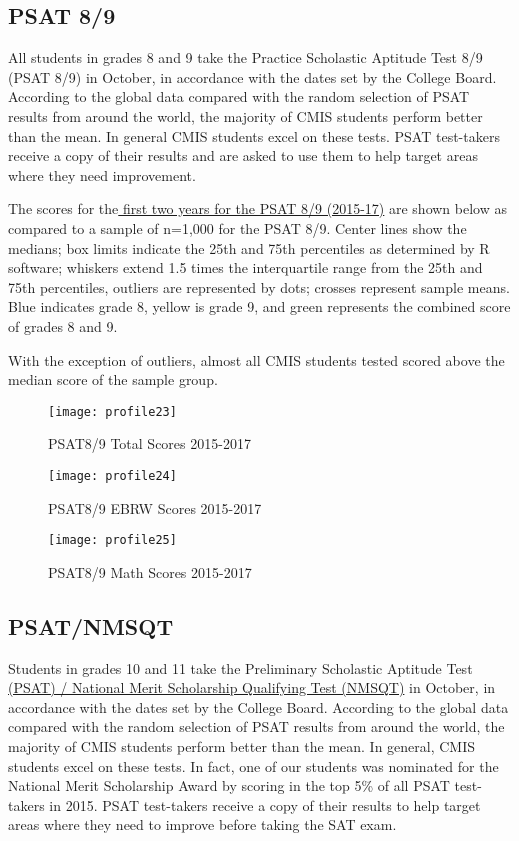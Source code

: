 \subsection{PSAT 8/9}

All students in grades 8 and 9 take the Practice Scholastic Aptitude Test 8/9 (PSAT 8/9) in October, in accordance with the dates set by the College Board. According to the global data compared with the random selection of PSAT results from around the world, the majority of CMIS students perform better than the mean. In general CMIS students excel on these tests.   PSAT test-takers receive a copy of their results and are asked to use them to help target areas where they need improvement.  

The scores for the\href{https://docs.google.com/a/cmis.ac.th/spreadsheets/d/1OVMnw4x1eUg-QByMt2J2IZJkovZGys_8uoj1SKSM2As/edit?usp=sharing}{ first two years for the PSAT 8/9 (2015-17)} are shown below as compared to a sample of n=1,000 for the PSAT 8/9.  Center lines show the medians; box limits indicate the 25th and 75th percentiles as determined by R software; whiskers extend 1.5 times the interquartile range from the 25th and 75th percentiles, outliers are represented by dots; crosses represent sample means. Blue indicates grade 8, yellow is grade 9, and green represents the combined score of grades 8 and 9.  

With the exception of outliers, almost all CMIS students tested scored above the median score of the sample group.  

\begin{figure}
\centering
\texttt{[image: profile23]}
\caption{PSAT8/9 Total Scores 2015-2017}
\end{figure}

\begin{figure}
\centering
\texttt{[image: profile24]}
\caption{PSAT8/9 EBRW Scores 2015-2017}
\end{figure}

\begin{figure}
\centering
\texttt{[image: profile25]}
\caption{PSAT8/9 Math Scores 2015-2017}
\end{figure}

\subsection{PSAT/NMSQT}

Students in grades 10 and 11 take the Preliminary Scholastic Aptitude Test\href{https://drive.google.com/drive/folders/0B71\_pYxcTLo-VGNkQlZtTFlIQlE}{ (PSAT) / National Merit Scholarship Qualifying Test (NMSQT)} in October, in accordance with the dates set by the College Board. According to the global data compared with the random selection of PSAT results from around the world, the majority of CMIS students perform better than the mean. In general, CMIS students excel on these tests.  In fact, one of our students was nominated for the National Merit Scholarship Award by scoring in the top 5\% of all PSAT test-takers in 2015.  PSAT test-takers receive a copy of their results to help target areas where they need to improve before taking the SAT exam.  

